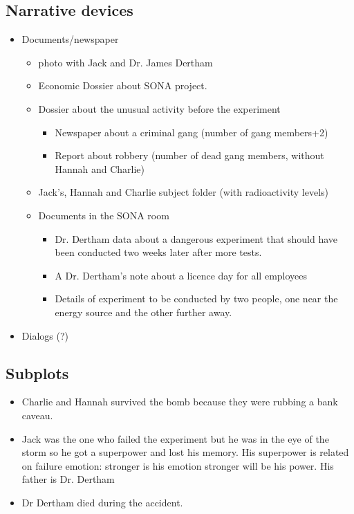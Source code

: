 \subsection{Narrative devices}
\begin{itemize}  
\item Documents/newspaper
\begin{itemize}
\item photo with Jack and Dr. James Dertham
\item Economic Dossier about SONA project.
\item Dossier about the unusual activity before the experiment
\begin{itemize}  
\item Newspaper about a criminal gang (number of gang members+2)
\item Report about robbery (number of dead gang members, without Hannah and Charlie)
\end{itemize}
\item Jack’s, Hannah and Charlie subject folder (with radioactivity levels)
\item Documents in the SONA room
\begin{itemize}  
\item Dr. Dertham data about a dangerous experiment that should have been conducted two weeks later after more tests.
\item A Dr. Dertham’s note about a licence day for all employees 
\item Details of experiment to be conducted by two people, one near the energy source and the other further away.
\end{itemize}
\end{itemize}
\item Dialogs (?)
\end{itemize}

\subsection{Subplots}
\begin{itemize}  
\item Charlie and Hannah survived the bomb because they were rubbing a bank caveau. 
\item Jack was the one who failed the experiment but he was in the eye of the storm so he got a superpower and lost his memory. His superpower is related on failure emotion: stronger is his emotion stronger will be his power. His father is Dr. Dertham
\item Dr Dertham died during the accident. 
\end{itemize} 
